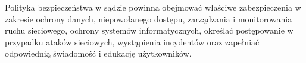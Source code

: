 Polityka bezpieczeństwa w sądzie powinna obejmować właściwe zabezpieczenia w zakresie ochrony danych, niepowołanego dostępu, zarządzania i monitorowania ruchu sieciowego, ochrony systemów informatycznych, określać postępowanie w przypadku ataków sieciowych, wystąpienia incydentów oraz zapełniać odpowiednią świadomość i edukację użytkowników.